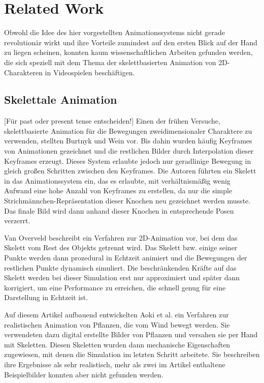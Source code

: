\chapter{Related Work}

Obwohl die Idee des hier vorgestellten Animationssystems nicht gerade revolutionär wirkt und ihre Vorteile zumindest auf den ersten Blick auf der Hand zu liegen scheinen, konnten kaum wissenschaftlichen Arbeiten gefunden werden, die sich speziell mit dem Thema der skelettbasierten Animation von 2D-Charakteren in Videospielen beschäftigen.

\section{Skelettale Animation}
 [Für past oder present tense entscheiden!]
Einen der frühen Versuche, skelettbasierte Animation für die Bewegungen zweidimensionaler Charaktere zu verwenden, stellten Burtnyk und Wein \cite{burtnyk1976interactive} vor. Bis dahin wurden häufig Keyframes von Animationen gezeichnet und die restlichen Bilder durch Interpolation dieser Keyframes erzeugt. Dieses System erlaubte jedoch nur geradlinige Bewegung in gleich großen Schritten zwischen den Keyframes. Die Autoren führten ein Skelett in das Animationssystem ein, das es erlaubte, mit verhältnismäßig wenig Aufwand eine hohe Anzahl von Keyframes zu erstellen, da nur die simple Strichmännchen-Repräsentation dieser Knochen neu gezeichnet werden musste. Das finale Bild wird dann anhand dieser Knochen in entsprechende Posen verzerrt.

Van Overveld \cite{van1990technique} beschreibt ein Verfahren zur 2D-Animation vor, bei dem das Skelett vom Rest des Objekts getrennt wird. Das Skelett bzw. einige seiner Punkte werden dann prozedural in Echtzeit animiert und die Bewegungen der restlichen Punkte dynamisch simuliert. Die beschränkenden Kräfte auf das Skelett werden bei dieser Simulation erst nur approximiert und später dann korrigiert, um eine Performance zu erreichen, die schnell genug für eine Darstellung in Echtzeit ist.

Auf diesem Artikel aufbauend entwickelten Aoki et al. \cite{aoki1999dynamic} ein Verfahren zur realistischen Animation von Pflanzen, die vom Wind bewegt werden. Sie verwendeten dazu digital erstellte Bilder von Pflanzen und versahen sie per Hand mit Skeletten. Diesen Skeletten wurden dann mechanische Eigenschaften zugewiesen, mit denen die Simulation im letzten Schritt arbeitete. Sie beschreiben ihre Ergebnisse als sehr realistisch, mehr als zwei im Artikel enthaltene Beispielbilder konnten aber nicht gefunden werden.

